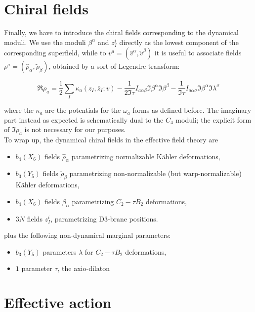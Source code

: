 \section{Chiral fields}

Finally, we have to introduce the chiral fields corresponding to the dynamical moduli. We use the moduli $\beta^\alpha$ and $z_I^i$ directly as the lowest component of the corresponding superfield, while to $v^a = (\hat v^\alpha,\tilde v^\beta)$ it is useful to associate fields $\rho^a = (\hat \rho_\alpha, \tilde \rho_\beta)$, obtained by a sort of Legendre transform:

\begin{equation}
	\Re{\rho_a} = \frac{1}{2}\sum_I \kappa_a(z_I, \bar z_I ; v) - \frac{1}{2 \Im \tau} I_{a\alpha\beta} \Im \beta^\alpha \Im \beta^\beta - \frac{1}{\Im \tau} I_{a\alpha\sigma} \Im \beta^\alpha \Im \lambda^\sigma
	\label{}
\end{equation}

where the $\kappa_a$ are the potentials for the $\omega_a$ forms as defined before. The imaginary part instead as expected is schematically dual to the $C_4$ moduli; the explicit form of $\Im \rho_a$ is not necessary for our purposes.\\

To wrap up, the dynamical chiral fields in the effective field theory are 

\begin{itemize}
	\item $b_4(X_6)$ fields $\hat\rho_\alpha$ parametrizing normalizable K\"ahler deformations,
	\item $b_3(Y_5)$ fields $\tilde\rho_\beta$ parametrizing non-normalizable (but warp-normalizable) K\"ahler deformations,
	\item $b_4(X_6)$ fields $\beta_\alpha$ parametrizing $C_2 - \tau B_2$ deformations,
	\item $3N$ fields $z_I^i$, parametrizing D3-brane positions.
\end{itemize}

plus the following non-dynamical marginal parameters:

\begin{itemize}
	\item $b_3(Y_5)$ parameters $\lambda$ for $C_2 - \tau B_2$ deformations,
	\item $1$ parameter $\tau$, the axio-dilaton
\end{itemize}

\section{Effective action}

